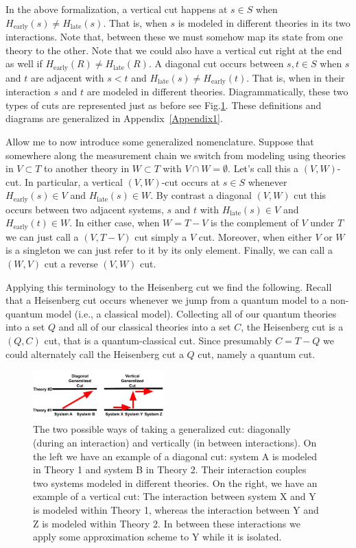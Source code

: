 \documentclass[12pt,prd,superscriptaddress,floatfix,amsmath,amssymb,amsfonts,nofootinbib]{revtex4-2}
\begin{document}
In the above formalization, a vertical cut happens at $s\in S$ when $H_\text{early}(s)\neq H_\text{late}(s)$. That is, when $s$ is modeled in different theories in its two interactions. Note that, between these we must somehow map its state from one theory to the other. Note that we could also have a vertical cut right at the end as well if $H_\text{early}(R)\neq H_\text{late}(R)$. A diagonal cut occurs between $s,t\in S$ when $s$ and $t$ are adjacent with $s<t$ and $H_\text{late}(s)\neq H_\text{early}(t)$. That is, when in their interaction $s$ and $t$ are modeled in different theories. Diagrammatically, these two types of cuts are represented just as before see Fig.\ref{FigGen}. These definitions and diagrams are generalized in Appendix~\ref{Appendix1}.

Allow me to now introduce some generalized nomenclature. Suppose that somewhere along the measurement chain we switch from modeling using theories in $V\subset T$ to another theory in $W\subset T$ with $V\cap W=\emptyset$. Let's call this a $(V,W)$-cut. In particular, a vertical $(V,W)$-cut occurs at $s\in S$ whenever $H_\text{early}(s)\in V$ and $H_\text{late}(s)\in W$. By contrast a diagonal $(V,W)$ cut this occurs between two adjacent systems, $s$ and $t$ with $H_\text{late}(s)\in V$ and $H_\text{early}(t)\in W$. In either case, when $W=T-V$ is the complement of $V$ under $T$ we can just call a $(V,T-V)$ cut simply a $V$ cut. Moreover, when either $V$ or $W$ is a singleton we can just refer to it by its only element. Finally, we can call a $(W,V)$ cut a reverse $(V,W)$ cut.

Applying this terminology to the Heisenberg cut we find the following. Recall that a Heisenberg cut occurs whenever we jump from a quantum model to a non-quantum model (i.e., a classical model). Collecting all of our quantum theories into a set $Q$ and all of our classical theories into a set $C$, the Heisenberg cut is a $(Q,C)$ cut, that is a quantum-classical cut. Since presumably $C=T-Q$ we could alternately call the Heisenberg cut a $Q$ cut, namely a quantum cut.

\begin{figure}
\includegraphics[width=0.45\textwidth]{Figures/DiagVsVertGen.pdf}
\caption{The two possible ways of taking a generalized cut: diagonally (during an interaction) and vertically (in between interactions). On the left we have an example of a diagonal cut: system A is modeled in Theory 1 and system B in Theory 2. Their interaction couples two systems modeled in different theories. On the right, we have an example of a vertical cut: The interaction between system X and Y is modeled within Theory 1, whereas the interaction between Y and Z is modeled within Theory 2. In between these interactions we apply some approximation scheme to Y while it is isolated.}\label{FigGen}
\end{figure}
\end{document}
